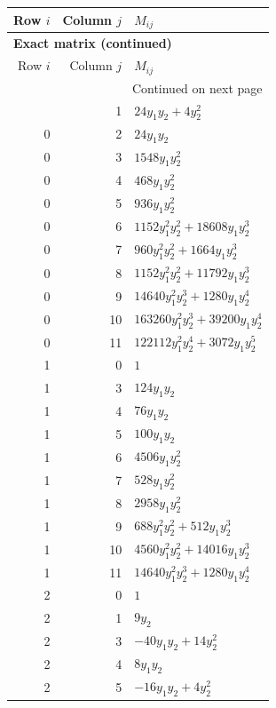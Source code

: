 \documentclass[10pt,a4paper]{article}
\begin{document}
{\small\setlength{\tabcolsep}{7pt}\begin{longtable}{rrp{125mm}}
\toprule Row $i$ & Column $j$ & $M_{ij}$\\\midrule\endfirsthead
\multicolumn{3}{l}{\textbf{Exact matrix (continued)}}\\
\toprule Row $i$ & Column $j$ & $M_{ij}$\\\midrule\endhead
\midrule\multicolumn{3}{r}{Continued on next page}\\\endfoot\bottomrule\endlastfoot
0 & 1 & $24 y_{1} y_{2} + 4 y_{2}^{2}$\\
0 & 2 & $24 y_{1} y_{2}$\\
0 & 3 & $1548 y_{1} y_{2}^{2}$\\
0 & 4 & $468 y_{1} y_{2}^{2}$\\
0 & 5 & $936 y_{1} y_{2}^{2}$\\
0 & 6 & $1152 y_{1}^{2} y_{2}^{2} + 18608 y_{1} y_{2}^{3}$\\
0 & 7 & $960 y_{1}^{2} y_{2}^{2} + 1664 y_{1} y_{2}^{3}$\\
0 & 8 & $1152 y_{1}^{2} y_{2}^{2} + 11792 y_{1} y_{2}^{3}$\\
0 & 9 & $14640 y_{1}^{2} y_{2}^{3} + 1280 y_{1} y_{2}^{4}$\\
0 & 10 & $163260 y_{1}^{2} y_{2}^{3} + 39200 y_{1} y_{2}^{4}$\\
0 & 11 & $122112 y_{1}^{2} y_{2}^{4} + 3072 y_{1} y_{2}^{5}$\\
1 & 0 & $1$\\
1 & 3 & $124 y_{1} y_{2}$\\
1 & 4 & $76 y_{1} y_{2}$\\
1 & 5 & $100 y_{1} y_{2}$\\
1 & 6 & $4506 y_{1} y_{2}^{2}$\\
1 & 7 & $528 y_{1} y_{2}^{2}$\\
1 & 8 & $2958 y_{1} y_{2}^{2}$\\
1 & 9 & $688 y_{1}^{2} y_{2}^{2} + 512 y_{1} y_{2}^{3}$\\
1 & 10 & $4560 y_{1}^{2} y_{2}^{2} + 14016 y_{1} y_{2}^{3}$\\
1 & 11 & $14640 y_{1}^{2} y_{2}^{3} + 1280 y_{1} y_{2}^{4}$\\
2 & 0 & $1$\\
2 & 1 & $9 y_{2}$\\
2 & 3 & $- 40 y_{1} y_{2} + 14 y_{2}^{2}$\\
2 & 4 & $8 y_{1} y_{2}$\\
2 & 5 & $- 16 y_{1} y_{2} + 4 y_{2}^{2}$\\

\end{longtable}}
\end{document}
